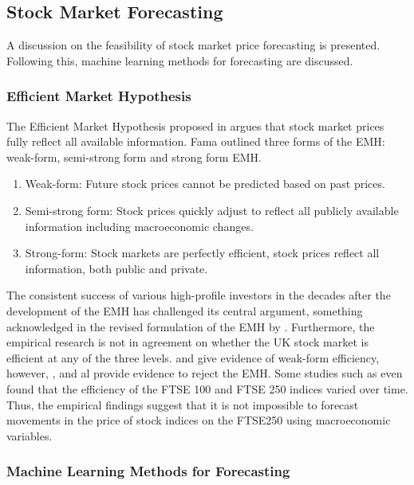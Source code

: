 \documentclass[11pt,a4paper]{article}
\newcommand{\citeboth}[1]{\citeauthor{#1} \citep{#1}}
\begin{document}
\subsection{Stock Market Forecasting}

A discussion on the feasibility of stock market price forecasting is presented. Following this, machine learning methods for forecasting are 
discussed.


\subsubsection{Efficient Market Hypothesis}

The Efficient Market Hypothesis proposed in \citeboth{fama1970} argues that stock market prices fully 
reflect all available information. Fama outlined three forms of the EMH:
weak-form, semi-strong form and strong form EMH.
\begin{enumerate}
    \item Weak-form: Future stock prices cannot be predicted based on past prices.
    \item Semi-strong form: Stock prices quickly adjust to reflect all publicly available information including macroeconomic changes.  
    \item Strong-form: Stock markets are perfectly efficient, stock prices reflect all information, both public and private.
\end{enumerate}

The consistent success of various high-profile investors in the decades 
after the development of the EMH has challenged 
its central argument, something acknowledged in the revised formulation of the EMH 
by \citeboth{fama1991}. Furthermore, the empirical research is not in 
agreement on whether the UK stock market is efficient at any of the three levels. 
\citeboth{libberton2010} and \citeboth{rounaghi} give evidence of weak-form efficiency,
however, \citeboth{borges2010}, \citeboth{asghar2023} and \citeboth{bhavsar2015} al provide evidence to reject the EMH. 
Some studies such as \citeboth{rosini2020} even found that the 
efficiency of the FTSE 100 and FTSE 250 indices varied over time. Thus, the empirical findings suggest 
that it is not impossible to forecast movements in the 
price of stock indices on the FTSE250 using macroeconomic variables.



\subsubsection{Machine Learning Methods for Forecasting}
\label{subsubsec: fore}
\end{document}
